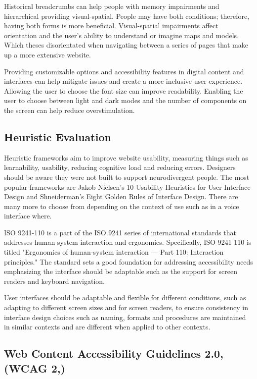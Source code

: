 \documentclass{article}
\begin{document}
Historical breadcrumbs can help people with memory impairments and hierarchical providing visual-spatial. People may have both conditions; therefore, having both forms is more beneficial. Visual-spatial impairments affect orientation and the user's ability to understand or imagine maps and models. Which theses disorientated when navigating between a series of pages that make up a more extensive website.  

Providing customizable options and accessibility features in digital content and interfaces can help mitigate issues and create a more inclusive user experience. Allowing the user to choose the font size can improve readability. Enabling the user to choose between light and dark modes and the number of components on the screen can help reduce overstimulation. 

\subsection{Heuristic Evaluation}

Heuristic frameworks aim to improve website usability, measuring things such as learnability, usability, reducing cognitive load and reducing errors. Designers should be aware they were not built to support neurodivergent people. The most popular frameworks are Jakob Nielsen's 10 Usability Heuristics for User Interface Design and Shneiderman's Eight Golden Rules of Interface Design. There are many more to choose from depending on the context of use such as in a voice interface where.

ISO 9241-110 is a part of the ISO 9241 series of international standards that addresses human-system interaction and ergonomics. Specifically, ISO 9241-110 is titled "Ergonomics of human-system interaction — Part 110: Interaction principles." The standard sets a good foundation for addressing accessibility needs emphasizing the interface should be adaptable such as the support for screen readers and keyboard navigation.

User interfaces should be adaptable and flexible for different conditions, such as adapting to different screen sizes and for screen readers, to ensure consistency in interface design choices such as naming, formats and procedures are maintained in similar contexts and are different when applied to other contexts. 

\subsection{Web Content Accessibility Guidelines 2.0,(WCAG 2,)}
\end{document}
